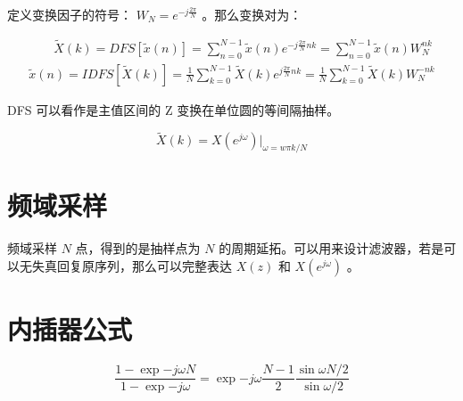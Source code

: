 \documentclass[cn,11pt,chinese,black,simple]{../elegantbook}
\begin{document}
定义变换因子的符号： \(W_N = e^{-j \frac{2\pi}{N}}\) 。那么变换对为：

$$
\begin{array}{l}
\qquad \tilde{X}(k)=D F S[\tilde{x}(n)]=\sum_{n=0}^{N-1} \tilde{x}(n) e^{-j \frac{2 \pi}{N} n k}=\sum_{n=0}^{N-1} \tilde{x}(n) W_{N}^{n k} \\
\tilde{x}(n)=I D F S[\tilde{X}(k)]=\frac{1}{N} \sum_{k=0}^{N-1} \tilde{X}(k) e^{j \frac{2 \pi}{N} n k}=\frac{1}{N} \sum_{k=0}^{N-1} \tilde{X}(k) W_{N}^{-n k}
\end{array}
$$

DFS 可以看作是主值区间的 Z 变换在单位圆的等间隔抽样。

\[\tilde{X}(k) = X(e^{j\omega}) | _{\omega = w\pi k / N}\]

\section{频域采样}

频域采样 \(N\) 点，得到的是抽样点为 \(N\) 的周期延拓。可以用来设计滤波器，若是可以无失真回复原序列，那么可以完整表达 \(X(z)\) 和 \(X(e^{j\omega})\) 。

\section{内插器公式}

\[\frac{1-\exp{-j\omega N}}{1-\exp{-j\omega}} = \exp{-j\omega\frac{N-1}{2}} \frac{\sin {\omega N / 2}}{\sin {\omega / 2}}\]


\let\chapname\undefined
\ifx\mainclass\undefined
\end{document}
